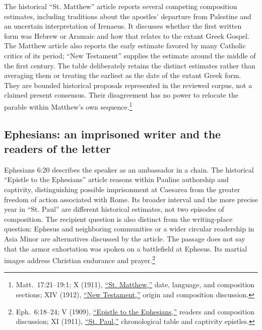 The historical ``St. Matthew'' article reports several competing
composition estimates, including traditions about the apostles'
departure from Palestine and an uncertain interpretation of Irenaeus.
It discusses whether the first written form was Hebrew or Aramaic and
how that relates to the extant Greek Gospel. The Matthew article also reports the early estimate favored by many
Catholic critics of its period; ``New Testament'' supplies the estimate
around the middle of the first century. The table deliberately
retains the distinct estimates rather than averaging them or treating
the earliest as the date of the extant Greek form. They are bounded
historical proposals represented in the reviewed corpus, not a claimed
present consensus. Their disagreement has no power to relocate the
parable within Matthew's own sequence.\footnote{Matt.~17:21--19:1;
 X (1911),
\href{https://www.newadvent.org/cathen/10057a.htm}{``St. Matthew,''}
date, language, and composition sections; XIV (1912),
\href{https://www.newadvent.org/cathen/14530a.htm}{``New Testament,''}
origin and composition discussion.}

\subsection{Ephesians: an imprisoned writer and the readers of the letter}
\label{hist-ephesians}
Ephesians 6:20 describes the speaker as an ambassador in a chain.
The historical ``Epistle to the Ephesians'' article reasons within
Pauline authorship and captivity, distinguishing possible imprisonment
at Caesarea from the greater freedom of action associated with Rome.
Its broader interval and the more precise year in ``St. Paul'' are
different historical estimates, not two episodes of composition. The
recipient question is also distinct from the writing-place question:
Ephesus and neighboring communities or a wider circular readership in
Asia Minor are alternatives discussed by the article. The passage does
not say that the armor exhortation was spoken on a battlefield at
Ephesus. Its martial images address Christian endurance and prayer.\footnote{
Eph.~6:18--24;  V (1909),
\href{https://www.newadvent.org/cathen/05485a.htm}{``Epistle to the Ephesians,''}
readers and composition discussion; XI (1911),
\href{https://www.newadvent.org/cathen/11567b.htm}{``St. Paul,''}
chronological table and captivity epistles.}
